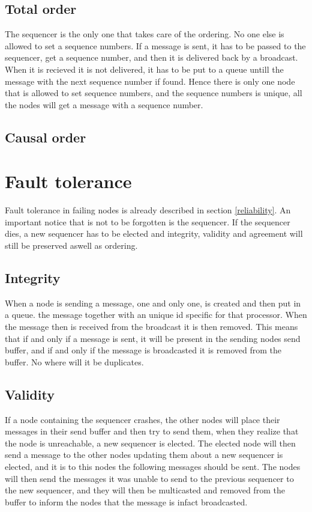 \documentclass{article}
\begin{document}
\subsection{Total order}
  The sequencer is the only one that takes care of the ordering. 
  No one else is allowed to set a sequence numbers. If a message 
  is sent, it has to be passed to the sequencer, get a sequence 
  number, and then it is delivered back by a broadcast. When it 
  is recieved it is not delivered, it has to be put to a queue 
  untill the message with the next sequence number if found. 
  Hence there is only one node that is allowed to set sequence 
  numbers, and the  sequence numbers is unique, all the nodes 
  will get a message with a sequence number.
  
\subsection{Causal order}
\section{Fault tolerance}
  Fault tolerance in failing nodes is already described in section \ref{reliability}.
  An important notice that is not to be forgotten is the sequencer. If the sequencer 
  dies, a new sequencer has to be elected and integrity, validity and agreement will 
  still be preserved aswell as ordering.
  \subsection{Integrity}
    When a node is sending a message, one and only one, is created and then put in a queue.
    the message together with an unique id specific for that processor. When the message then is 
    received from the broadcast it is then removed. This means that if and only if a message is 
    sent, it    will be present in the sending nodes send buffer, and if and only if the message
    is broadcasted it is removed from the buffer. No where will it be duplicates.
    
  \subsection{Validity}
    If a node containing the sequencer crashes, the other nodes will place their messages in their
    send buffer and then try to send them, when they realize that the node is unreachable, a new 
    sequencer is elected. The elected node will then send a message to the other nodes updating them
    about a new sequencer is elected, and it is to this nodes the following messages should be sent.
    The nodes will then send the messages it was unable to send to the previous sequencer to the
    new sequencer, and they will then be multicasted and removed from the buffer to inform the nodes
    that the message is infact broadcasted.
\end{document}
